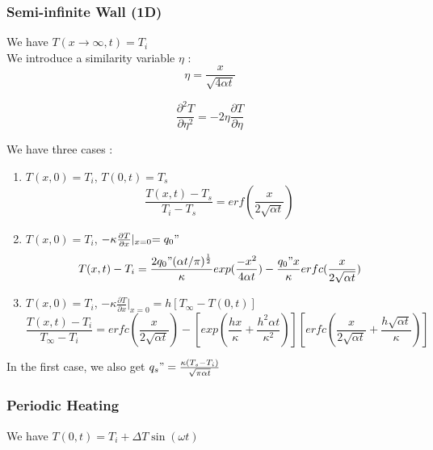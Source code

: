 \documentclass[../main.tex]{subfiles}
\begin{document}
\subsubsection{Semi-infinite Wall (1D)}
We have $T(x\rightarrow \infty, t) = T_i$\\

We introduce a similarity variable $\eta$ : \begin{equation}
    \eta = \frac{x}{\sqrt{4 \alpha t}}
\end{equation}

\begin{equation}
    \frac{\partial^2 T}{\partial \eta^2} = -2\eta \frac{\partial T}{\partial \eta}
\end{equation}

We have three cases : \begin{enumerate}
    \item $T(x,0) = T_i$, $T(0,t) = T_s$ \begin{equation}
        \frac{T(x,t) - T_s}{T_i-T_s} = erf(\frac{x}{2\sqrt{\alpha t}})
    \end{equation}
    \item $T(x,0) = T_i$, $-\kappa \frac{\partial T}{\partial x}\lvert_{x=0} = q_0"$ \begin{equation}
        T(x,t) - T_i = \frac{2 q_0" (\alpha t/ \pi)^{\frac{1}{2}}}{\kappa} exp(\frac{-x^2}{4 \alpha t}) - \frac{q_0" x}{\kappa} erfc(\frac{x}{2\sqrt{\alpha t}})
    \end{equation}
    \item $T(x,0) = T_i$, $-\kappa \frac{\partial T}{\partial x}\lvert_{x=0} = h[T_\infty - T(0,t)]$ \begin{equation}
        \frac{T(x,t) - T_i}{T_\infty - T_i} = erfc(\frac{x}{2\sqrt{\alpha t}}) - [exp(\frac{h x}{\kappa} + \frac{h^2 \alpha t}{\kappa^2})] [erfc(\frac{x}{2\sqrt{\alpha t}} + \frac{h \sqrt{\alpha t}}{\kappa})]
    \end{equation}
\end{enumerate}

In the first case, we also get $q_s" = \frac{\kappa (T_s-T_i)}{\sqrt{\pi \alpha t}}$\\

\subsubsection{Periodic Heating}
We have $T(0,t) = T_i + \Delta T \sin(\omega t)$\\
\end{document}
